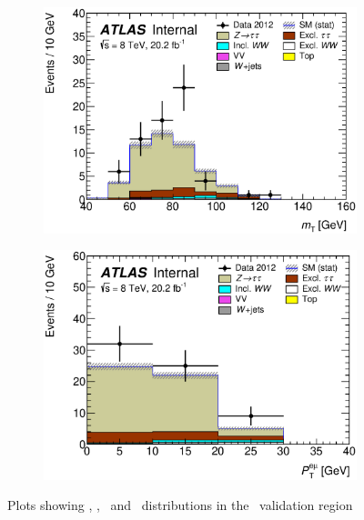 \begin{figure}[!h]
\begin{subfigure}{0.5\textwidth}
   \includegraphics[width=\textwidth]{figures/emme-CutTopoMll-MT_ztau-lin.eps}
\end{subfigure} 
\begin{subfigure}{0.5\textwidth}
   \includegraphics[width=\textwidth]{figures/emme-CutTopoMll-Ptll_ztau-lin.eps}
\end{subfigure} 
\caption{Plots showing \memu, \dFem, \mT\ and \pTemu\ distributions in the \Ztau\ validation region}
\label{fig:ZtauCR}
\end{figure}
